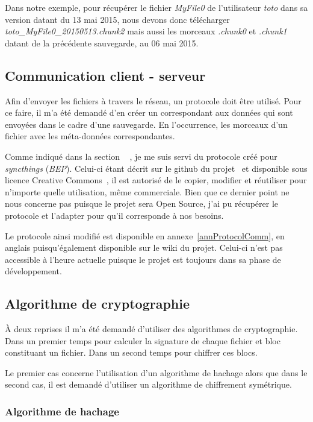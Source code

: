 \documentclass[a4paper,10pt, twoside]{report}
\begin{document}
\begin{spacing}{1.2}
Dans notre exemple, pour récupérer le fichier \textit{MyFile0} de
l'utilisateur \textit{toto}  dans sa version datant du 13 mai 2015, nous devons
donc télécharger \textit{toto\_MyFile0\_20150513.chunk2} mais aussi les
morceaux \textit{.chunk0} et \textit{.chunk1} datant de la précédente
sauvegarde, au 06 mai 2015.

\subsection{Communication client - serveur}

Afin d'envoyer les fichiers à travers le réseau, un protocole doit être
utilisé. Pour ce faire, il m'a été demandé d'en créer un correspondant
aux données qui sont envoyées dans le cadre d'une sauvegarde. En l'occurrence,
les morceaux d'un fichier avec les méta-données correspondantes.

Comme indiqué dans la section \flqq~ \frqq, je me
suis servi du protocole créé pour \textit{syncthings} (\textit{BEP}).
Celui-ci étant décrit sur le github du projet~\cite{refBEP} et
disponible sous licence Creative Commons~\cite{refCC4.0}, il est autorisé de
le copier, modifier et réutiliser pour n'importe quelle utilisation, même
commerciale. Bien que ce dernier point ne nous concerne pas puisque le projet
sera Open Source, j'ai pu récupérer le protocole et l'adapter pour qu'il
corresponde à nos besoins.

Le protocole ainsi modifié est disponible en annexe~\ref{annProtocolComm}, en
anglais puisqu'également disponible sur le wiki du projet. Celui-ci n'est pas
accessible à l'heure actuelle puisque le projet est toujours dans sa phase de
développement.

\subsection{Algorithme de cryptographie}

À deux reprises il m'a été demandé d'utiliser des algorithmes de
cryptographie. Dans un premier temps pour calculer la signature de chaque
fichier et bloc constituant un fichier. Dans un second temps pour chiffrer
ces blocs.

Le premier cas concerne l'utilisation d'un algorithme de hachage alors que dans
le second cas, il est demandé d'utiliser un algorithme de chiffrement
symétrique.

\subsubsection{Algorithme de hachage}


\end{spacing}
\end{document}
